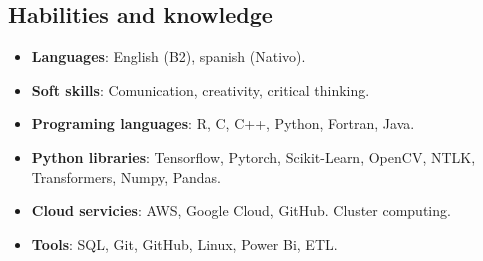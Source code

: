 \documentclass[a3paper]{adcv_color}
\begin{document}
\begin{minipage}{0.65\linewidth}
	\begin{addmargin}[0.5em]{0.5em}
		\section{Habilities and knowledge}

		\begin{itemize}
			\setlength\itemsep{0em}
			\item \textbf{Languages}: English (B2), spanish (Nativo).
			\item \textbf{Soft skills}:
				Comunication, creativity, critical thinking.
			\item \textbf{Programing languages}:
				R, C, C++, Python, Fortran, Java.
			\item \textbf{Python libraries}:
				Tensorflow, Pytorch, Scikit-Learn, OpenCV, NTLK, Transformers, Numpy, Pandas.
			\item \textbf{Cloud servicies}:
				AWS, Google Cloud, GitHub. Cluster computing.
			\item \textbf{Tools}:
				SQL, Git, GitHub, Linux, Power Bi, ETL.
		\end{itemize}
	\end{addmargin}
\end{minipage}
\end{document}
